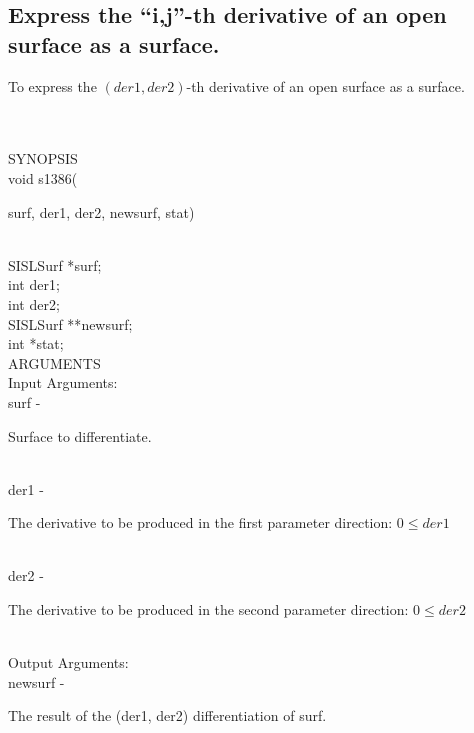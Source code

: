 \subsection{Express the ``i,j''-th derivative of an open surface as a \mbox{surface}.}
\begin{minipg1}
  To express the $(der1, der2)$-th derivative of an open surface as a surface.
\end{minipg1} \\ \\
SYNOPSIS\\
        \>void s1386(\begin{minipg3}
          {\fov surf}, {\fov der1}, {\fov der2}, {\fov newsurf}, {\fov stat})
        \end{minipg3}\\[0.3ex]
        \>\>    SISLSurf        \>      *{\fov surf};\\
        \>\>    int     \>      {\fov der1};\\
        \>\>    int     \>      {\fov der2};\\
        \>\>    SISLSurf        \>      **{\fov newsurf};\\
        \>\>    int     \>      *{\fov stat};\\
ARGUMENTS\\
        \>Input Arguments:\\
        \>\>    {\fov surf}     \> - \> \begin{minipg2}
                                Surface to differentiate.
                                \end{minipg2}\\
        \>\>    {\fov der1}     \> - \> \begin{minipg2}
                                The derivative to be produced in the first
                                parameter direction: $0\leq der1$
                                \end{minipg2}\\[0.8ex]
        \>\>    {\fov der2}     \> - \> \begin{minipg2}
                                The derivative to be produced in the second
                                parameter direction: $0\leq der2$
                                \end{minipg2}\\[0.8ex]
        \>Output Arguments:\\
        \>\>    {\fov newsurf}  \> - \> \begin{minipg2}
                                The result of the (der1, der2) differentiation of surf.
                                \end{minipg2}\\

